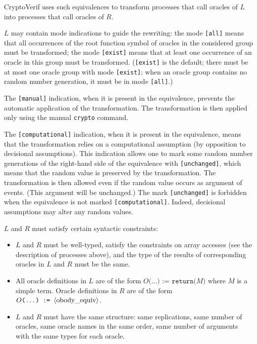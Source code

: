 \begin{itemize}
CryptoVerif uses such equivalences to transform processes that call
oracles of $L$ into processes that call oracles of $R$.

$L$ may contain mode indications to guide the rewriting: the mode
\texttt{[all]} means that all occurrences of the root function symbol
of oracles in the considered group must be transformed;
the mode \texttt{[exist]} means that at least one occurrence of an
oracle in this group must be transformed. (\texttt{[exist]} is the default;
there must be at most one oracle group with mode \texttt{[exist]};
when an oracle group contains no random number generation, it must be in mode 
\texttt{[all]}.)

The \texttt{[manual]} indication, when it is present in the equivalence,
prevents the automatic application of the transformation. The transformation
is then applied only using the manual \texttt{crypto} command.

The \texttt{[computational]} indication, when it is present in the 
equivalence, means that the transformation relies on a computational assumption
(by opposition to decisional assumptions). This indication allows one to mark
some random number generations of the right-hand side of the equivalence with
\texttt{[unchanged]}, which means that the random value is preserved by 
the transformation. The transformation is then allowed even if the random 
value occurs as argument of events. (This argument will be unchanged.)
The mark \texttt{[unchanged]} is forbidden when the equivalence is
not marked \texttt{[computational]}. Indeed, decisional assumptions may
alter any random values.

$L$ and $R$ must satisfy certain syntactic constraints:
\begin{itemize}

\item %
$L$ and $R$ must be well-typed, satisfy the constraints on
array accesses (see the description of processes above), 
and the type of the results of 
corresponding oracles in $L$ and $R$ must be the same.

\item All oracle definitions in $L$ are of the form 
$O\texttt{(}\ldots\texttt{) := return(}M\texttt{)}$
where $M$ is a simple term. %
Oracle definitions in $R$ are of the form 
$O\texttt{(}\ldots\texttt{) := }\langle\textrm{obody\_equiv}\rangle$.

\item $L$ and $R$ must have the same structure: same replications,
same number of oracles, same oracle names in the same order,
same number of arguments with the same types for each oracle.


\end{itemize}
\end{itemize}

